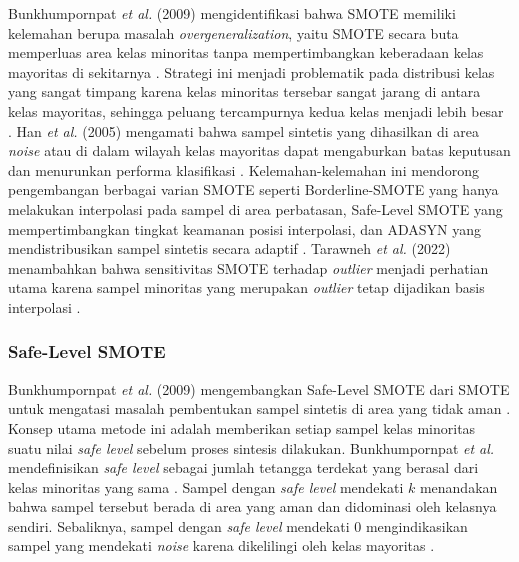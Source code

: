 Bunkhumpornpat \textit{et al.} (2009) mengidentifikasi bahwa SMOTE memiliki kelemahan berupa masalah \textit{overgeneralization}, yaitu SMOTE secara buta memperluas area kelas minoritas tanpa mempertimbangkan keberadaan kelas mayoritas di sekitarnya \cite{Bunkhumpornpat2009SafeLevel}. Strategi ini menjadi problematik pada distribusi kelas yang sangat timpang karena kelas minoritas tersebar sangat jarang di antara kelas mayoritas, sehingga peluang tercampurnya kedua kelas menjadi lebih besar \cite{Bunkhumpornpat2009SafeLevel}. Han \textit{et al.} (2005) mengamati bahwa sampel sintetis yang dihasilkan di area \textit{noise} atau di dalam wilayah kelas mayoritas dapat mengaburkan batas keputusan dan menurunkan performa klasifikasi \cite{Han2005BorderlineSMOTE}. Kelemahan-kelemahan ini mendorong pengembangan berbagai varian SMOTE seperti Borderline-SMOTE yang hanya melakukan interpolasi pada sampel di area perbatasan, Safe-Level SMOTE yang mempertimbangkan tingkat keamanan posisi interpolasi, dan ADASYN yang mendistribusikan sampel sintetis secara adaptif \cite{Han2005BorderlineSMOTE, Bunkhumpornpat2009SafeLevel, He2008ADASYN}. Tarawneh \textit{et al.} (2022) menambahkan bahwa sensitivitas SMOTE terhadap \textit{outlier} menjadi perhatian utama karena sampel minoritas yang merupakan \textit{outlier} tetap dijadikan basis interpolasi \cite{Tarawneh2022SMOTEFUNA}.

\subsubsection{Safe-Level SMOTE} \label{II.safelevel}
Bunkhumpornpat \textit{et al.} (2009) mengembangkan Safe-Level SMOTE dari SMOTE untuk mengatasi masalah pembentukan sampel sintetis di area yang tidak aman \cite{Bunkhumpornpat2009SafeLevel}. Konsep utama metode ini adalah memberikan setiap sampel kelas minoritas suatu nilai \textit{safe level} sebelum proses sintesis dilakukan. Bunkhumpornpat \textit{et al.} mendefinisikan \textit{safe level} sebagai jumlah tetangga terdekat yang berasal dari kelas minoritas yang sama \cite{Bunkhumpornpat2009SafeLevel}. Sampel dengan \textit{safe level} mendekati $k$ menandakan bahwa sampel tersebut berada di area yang aman dan didominasi oleh kelasnya sendiri. Sebaliknya, sampel dengan \textit{safe level} mendekati 0 mengindikasikan sampel yang mendekati \textit{noise} karena dikelilingi oleh kelas mayoritas \cite{Bunkhumpornpat2009SafeLevel}.


